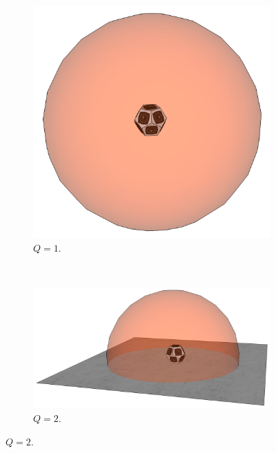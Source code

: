 \begin{figure}[ht]
    \centering
    \begin{subfigure}[b]{0.3\textwidth}
    	\centering
        \includegraphics[width=0.5\linewidth]{archivos/Q1.png}
        \caption{$Q=1$.}
    \end{subfigure}
    ~ %
    \begin{subfigure}[b]{0.3\textwidth}
    	\centering
        \includegraphics[width=0.8\linewidth]{archivos/Q2.png}
        \caption{$Q=2$.}
    \end{subfigure}
    

\end{figure}
